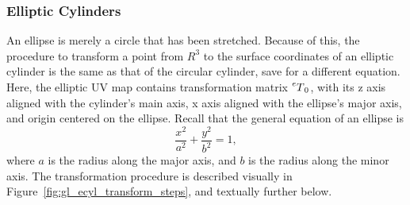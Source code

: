 \subsubsection{Elliptic Cylinders}
An ellipse is merely a circle that has been stretched.
Because of this, the procedure to transform a point from $R^3$ to the surface coordinates of an elliptic cylinder is the same as that of the circular cylinder, save for a different equation.
Here, the elliptic UV map contains transformation matrix $\prescript{e}{}T_0$, with its z axis aligned with the cylinder's main axis, x axis aligned with the ellipse's major axis, and origin centered on the ellipse.
Recall that the general equation of an ellipse is
\begin{equation*}
	\frac{x^2}{a^2} + \frac{y^2}{b^2} = 1,
\end{equation*}
where $a$ is the radius along the major axis, and $b$ is the radius along the minor axis.
The transformation procedure is described visually in Figure~\ref{fig:gl_ecyl_transform_steps}, and textually further below.


